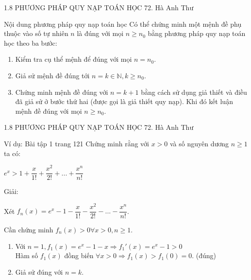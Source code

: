 \begin{frame}{1.8 PHƯƠNG PHÁP QUY NẠP TOÁN HỌC \hspace{2cm}  72. Hà Anh Thư} 

\begin{block}{Nội dung phương pháp quy nạp toán học}
Có thể chứng minh một mệnh đề phụ thuộc vào số tự nhiên $n$ là đúng với mọi $n \ge n_0$ bằng phương pháp quy nạp toán học theo ba bước:
\pause
\begin{enumerate}
    \item Kiểm tra cụ thể mệnh để đúng với mọi $n = n_0$.
    \pause
    \item Giả sử mệnh đề đúng tới $n = k \in \mathbb{N}, k \ge n_0$.
    \pause
    \item Chứng minh mệnh đề đúng với $n = k + 1$ bằng cách sử dụng giả thiết và điều đã giả sử ở bước thứ hai (được gọi là giả thiết quy nạp). Khi đó kết luận mệnh đề đúng với mọi $n \ge n_0$.
\end{enumerate}
\end{block} 
\end{frame}
\begin{frame}{1.8 PHƯƠNG PHÁP QUY NẠP TOÁN HỌC \hspace{2cm}  72. Hà Anh Thư} 
\begin{block}{Ví dụ: Bài tập 1 trang 121}
Chứng minh rằng với $x > 0$ và số nguyên dương $n \ge 1$ ta có:
\begin{center}
    $e^x > 1 + \dfrac{x}{1!} + \dfrac{x^2}{2!} + ... + \dfrac{x^n}{n!}$
\end{center}
\pause
\begin{center}
    Giải:   
\end{center}
Xét $f_n(x) = e^x - 1 - \dfrac{x}{1!} - \dfrac{x^2}{2!} - ... - \dfrac{x^n}{n!}$.

Cần chứng minh $f_n(x) > 0 \forall x > 0, n \ge 1$.
\pause
\begin{enumerate}
    \item Với $n = 1, f_1(x) = e^x - 1- x \Rightarrow f_1'(x) = e^x - 1 > 0$ \\
    \pause
    Hàm số $f_1(x)$ đồng biến $\forall x > 0 \Rightarrow f_1(x) > f_1(0) = 0$. (đúng)
    \pause
    \item Giả sử đúng với $n = k$.
\end{enumerate}
\end{block}
\end{frame}
